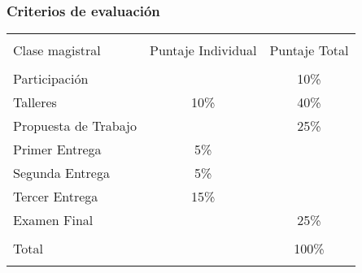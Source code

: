 \documentclass[
  shownotes,
  xcolor={svgnames},
  hyperref={colorlinks,citecolor=DarkBlue,linkcolor=DarkRed,urlcolor=DarkBlue}
  ]{beamer}
\begin{document}
\begin{frame}
\frametitle{Criterios de evaluación}

\begin{table}[H]
\begin{tabular}{lcc}
\hline 
\hline \\
Clase   magistral    & Puntaje Individual & Puntaje Total \\
\hline \\
Participación        &                    & 10\%          \\
Talleres             & 10\%               & 40\%          \\
Propuesta de Trabajo &                    & 25\%          \\
Primer Entrega       & 5\%                &               \\
Segunda Entrega      & 5\%                &               \\
Tercer Entrega       & 15\%               &               \\
Examen Final         &                    & 25\%          \\
\hline \\
Total                &                    & 100\%        \\
\hline 
\hline  \\
\end{tabular}
\end{table}


\end{frame}


\end{document}

